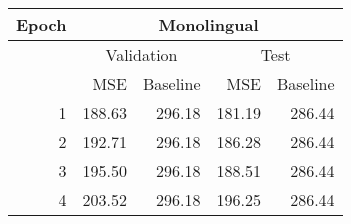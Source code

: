 \begin{tabular}{r|rr|rr}
     \hline
     \multirow{3}{*}{Epoch}    & \multicolumn{4}{c}{Monolingual} \\ 
     \hline
                               & \multicolumn{2}{c|}{Validation} &  \multicolumn{2}{c}{Test} \\
            &  MSE &  Baseline &  MSE &  Baseline \\
     \hline
     1 &   188.63 &                   296.18 &    181.19 &                    286.44 \\
     2 &   192.71 &                   296.18 &    186.28 &                    286.44 \\
     3 &   195.50 &                   296.18 &    188.51 &                    286.44 \\
     4 &   203.52 &                   296.18 &    196.25 &                    286.44 \\
\hline
\end{tabular}
